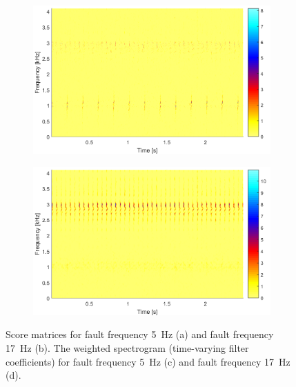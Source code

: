 \begin{figure}[!ht]
\begin{subfigure}[b]{0.49\textwidth}
        \centering
        \captionsetup{skip=0.01pt}
        \caption{}
        \includegraphics[width=\textwidth]{wykresy/chapter_application/semi_blind/mapka_simulated_5.png}
        \label{fig:chapter7/semi_blind/mapka_sim_5}
    \end{subfigure}
    \begin{subfigure}[b]{0.49\textwidth}
        \centering
        \captionsetup{skip=0.01pt}
        \caption{}
        \includegraphics[width=\textwidth]{wykresy/chapter_application/semi_blind/mapka_simulated_17.png}
        \label{fig:chapter7/semi_blind/mapka_sim_17}
    \end{subfigure}
    \vspace{\baselineskip}
    \caption{Score matrices for fault frequency 5~Hz (a) and fault frequency 17~Hz (b). The weighted spectrogram (time-varying filter coefficients) for fault frequency 5~Hz (c) and fault frequency 17~Hz (d). }
    \label{fig:chapter7/semi_blind/score_sim}
\end{figure} \\
